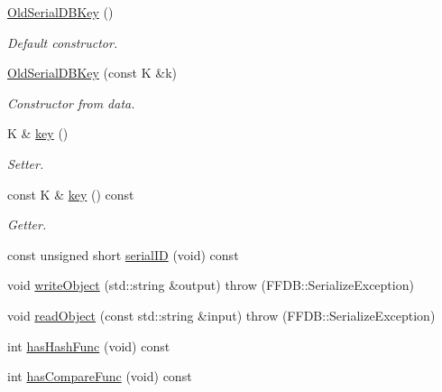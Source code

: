 \begin{DoxyCompactItemize}
\item 
\mbox{\hyperlink{classADATIO_1_1OldSerialDBKey_a4ebea5cb376cbc7ce81524c8b9723923}{Old\+Serial\+D\+B\+Key}} ()
\begin{DoxyCompactList}\small\item\em Default constructor. \end{DoxyCompactList}\item 
\mbox{\hyperlink{classADATIO_1_1OldSerialDBKey_a3b075f5aaa5e0d5e29f5a5dcfe51d575}{Old\+Serial\+D\+B\+Key}} (const K \&k)
\begin{DoxyCompactList}\small\item\em Constructor from data. \end{DoxyCompactList}\item 
K \& \mbox{\hyperlink{classADATIO_1_1OldSerialDBKey_ab191c26e658125d7ac4378c8b74d6f1b}{key}} ()
\begin{DoxyCompactList}\small\item\em Setter. \end{DoxyCompactList}\item 
const K \& \mbox{\hyperlink{classADATIO_1_1OldSerialDBKey_a10d8c5351439c43bacb5e365750e7b1d}{key}} () const
\begin{DoxyCompactList}\small\item\em Getter. \end{DoxyCompactList}\item 
const unsigned short \mbox{\hyperlink{classADATIO_1_1OldSerialDBKey_af45528e61ba59f1978d3492534dffd46}{serial\+ID}} (void) const
\item 
void \mbox{\hyperlink{classADATIO_1_1OldSerialDBKey_a4cc6346697a7bda74b9e14672cf21912}{write\+Object}} (std\+::string \&output)  throw (\+F\+F\+D\+B\+::\+Serialize\+Exception)
\item 
void \mbox{\hyperlink{classADATIO_1_1OldSerialDBKey_a4d79b5e8834dc154ddc981e153924ccd}{read\+Object}} (const std\+::string \&input)  throw (\+F\+F\+D\+B\+::\+Serialize\+Exception)
\item 
int \mbox{\hyperlink{classADATIO_1_1OldSerialDBKey_a5cf79bb34ed0e1a471eba03efe9988ad}{has\+Hash\+Func}} (void) const
\item 
int \mbox{\hyperlink{classADATIO_1_1OldSerialDBKey_a121b9e6811e4c16c9b05521b923b8dc7}{has\+Compare\+Func}} (void) const
\end{DoxyCompactItemize}
